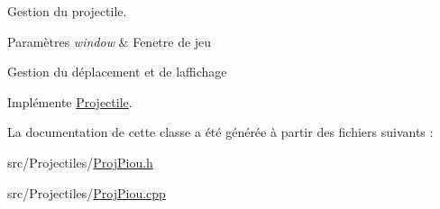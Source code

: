 Gestion du projectile. 


\begin{DoxyParams}{Paramètres}
{\em window} & Fenetre de jeu\\
\hline
\end{DoxyParams}
Gestion du déplacement et de l\textquotesingle{}affichage 

Implémente \hyperlink{class_projectile_a09e02b793473660fc59a329a4dfea0ec}{Projectile}.



La documentation de cette classe a été générée à partir des fichiers suivants \+:\begin{DoxyCompactItemize}
\item 
src/\+Projectiles/\hyperlink{_proj_piou_8h}{Proj\+Piou.\+h}\item 
src/\+Projectiles/\hyperlink{_proj_piou_8cpp}{Proj\+Piou.\+cpp}\end{DoxyCompactItemize}
